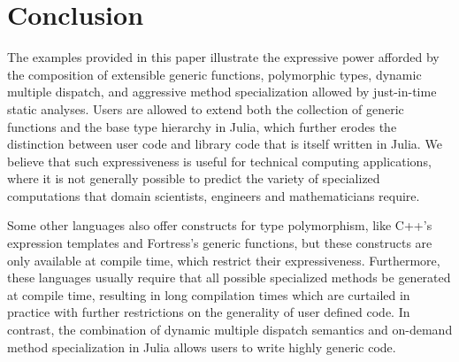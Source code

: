 \documentclass[10pt, preprint]{sigplanconf}
\begin{document}




\section{Conclusion}

The examples provided in this paper illustrate the expressive power afforded by
the composition of extensible generic functions, polymorphic types,
dynamic multiple dispatch, and aggressive method specialization allowed by
just-in-time static analyses. Users are allowed to extend both the collection
of generic functions and the base type hierarchy in Julia, which further erodes
the distinction between user code and library code that is itself written in
Julia. We believe that such expressiveness is useful for technical computing
applications, where it is not generally possible to predict the variety of
specialized computations that domain scientists, engineers and mathematicians
require.

Some other languages also offer constructs for type polymorphism, like C++'s
expression templates and Fortress's generic functions, but these constructs are
only available at compile time, which restrict their expressiveness.
Furthermore, these languages usually require that all possible specialized
methods be generated at compile time, resulting in long compilation times which
are curtailed in practice with further restrictions on the generality of user
defined code. In contrast, the combination of dynamic multiple dispatch
semantics and on-demand method specialization in Julia allows users to write
highly generic code.
\end{document}
